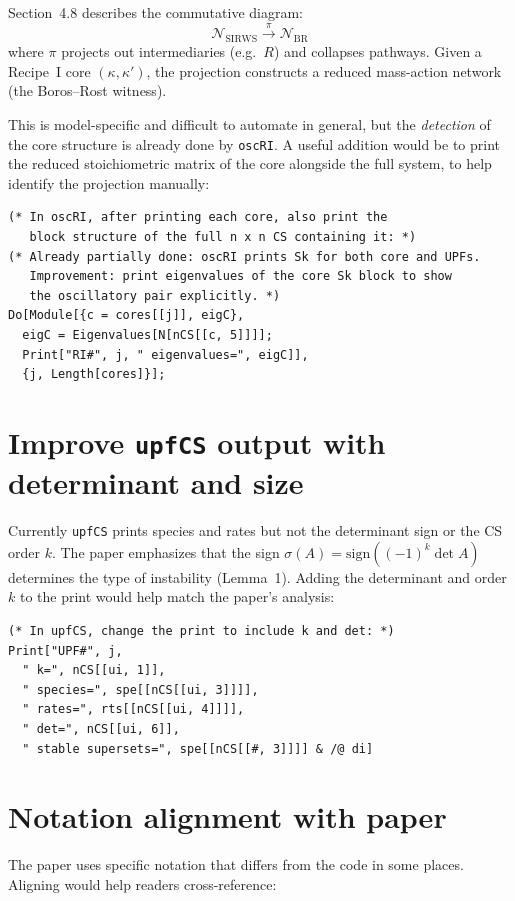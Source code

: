 \documentclass[11pt]{article}
\begin{document}
Section~4.8 describes the commutative diagram:
\[
\mathcal{N}_{\mathrm{SIRWS}} \xrightarrow{\pi} \mathcal{N}_{\mathrm{BR}}
\]
where $\pi$ projects out intermediaries (e.g.\ $R$) and collapses pathways.
Given a Recipe~I core $(\kappa, \kappa')$, the projection constructs a
reduced mass-action network (the Boros--Rost witness).

This is model-specific and difficult to automate in general, but the
\emph{detection} of the core structure is already done by \texttt{oscRI}.
A useful addition would be to print the reduced stoichiometric matrix
of the core alongside the full system, to help identify the projection
manually:
\begin{verbatim}
(* In oscRI, after printing each core, also print the
   block structure of the full n x n CS containing it: *)
(* Already partially done: oscRI prints Sk for both core and UPFs.
   Improvement: print eigenvalues of the core Sk block to show
   the oscillatory pair explicitly. *)
Do[Module[{c = cores[[j]], eigC},
  eigC = Eigenvalues[N[nCS[[c, 5]]]];
  Print["RI#", j, " eigenvalues=", eigC]],
  {j, Length[cores]}];
\end{verbatim}


\section{Improve \texttt{upfCS} output with determinant and size}

Currently \texttt{upfCS} prints species and rates but not the determinant sign
or the CS order $k$. The paper emphasizes that the sign
$\sigma(A) = \mathrm{sign}((-1)^k \det A)$ determines the type of instability
(Lemma~1). Adding the determinant and order $k$ to the print would help match
the paper's analysis:
\begin{verbatim}
(* In upfCS, change the print to include k and det: *)
Print["UPF#", j,
  " k=", nCS[[ui, 1]],
  " species=", spe[[nCS[[ui, 3]]]],
  " rates=", rts[[nCS[[ui, 4]]]],
  " det=", nCS[[ui, 6]],
  " stable supersets=", spe[[nCS[[#, 3]]]] & /@ di]
\end{verbatim}


\section{Notation alignment with paper}

The paper uses specific notation that differs from the code in some places.
Aligning would help readers cross-reference:
\end{document}
